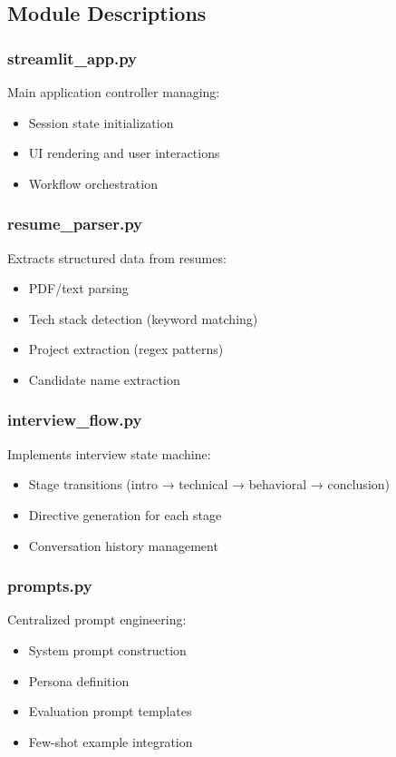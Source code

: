 \documentclass[12pt,a4paper]{article}
\begin{document}
\subsection{Module Descriptions}

\subsubsection{streamlit\_app.py}
Main application controller managing:
\begin{itemize}
    \item Session state initialization
    \item UI rendering and user interactions
    \item Workflow orchestration
\end{itemize}

\subsubsection{resume\_parser.py}
Extracts structured data from resumes:
\begin{itemize}
    \item PDF/text parsing
    \item Tech stack detection (keyword matching)
    \item Project extraction (regex patterns)
    \item Candidate name extraction
\end{itemize}

\subsubsection{interview\_flow.py}
Implements interview state machine:
\begin{itemize}
    \item Stage transitions (intro → technical → behavioral → conclusion)
    \item Directive generation for each stage
    \item Conversation history management
\end{itemize}

\subsubsection{prompts.py}
Centralized prompt engineering:
\begin{itemize}
    \item System prompt construction
    \item Persona definition
    \item Evaluation prompt templates
    \item Few-shot example integration
\end{itemize}
\end{document}

